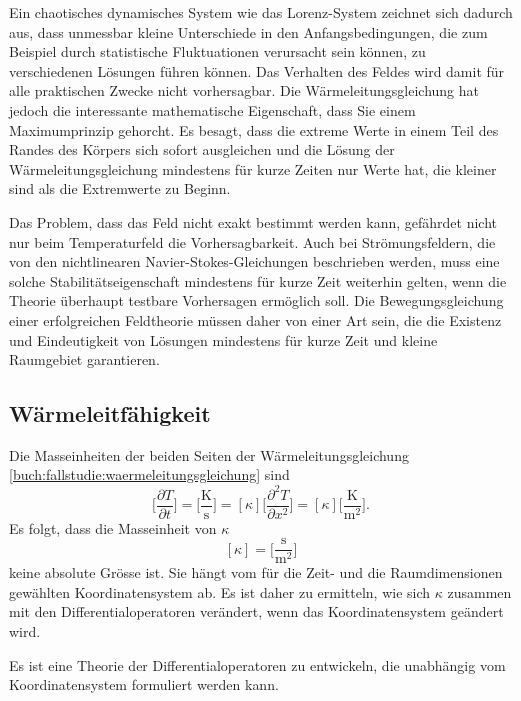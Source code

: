 Ein chaotisches dynamisches System wie das Lorenz-System zeichnet sich
dadurch aus, dass unmessbar kleine Unterschiede in den Anfangsbedingungen,
die zum Beispiel durch statistische Fluktuationen verursacht sein können,
zu verschiedenen Lösungen führen können.
Das Verhalten des Feldes wird damit für alle praktischen Zwecke nicht
vorhersagbar.
Die Wärmeleitungsgleichung hat jedoch die interessante mathematische
Eigenschaft, dass Sie einem Maximumprinzip gehorcht.
Es besagt, dass die extreme Werte in einem Teil des Randes des Körpers
sich sofort ausgleichen und die Lösung der Wärmeleitungsgleichung
mindestens für kurze Zeiten nur Werte hat, die kleiner sind als die 
Extremwerte zu Beginn.

Das Problem, dass das Feld nicht exakt bestimmt werden kann, gefährdet
nicht nur beim Temperaturfeld die Vorhersagbarkeit.
Auch bei Strömungsfeldern, die von den nichtlinearen
Navier-Stokes-Gleichungen beschrieben werden, muss eine solche
Stabilitätseigenschaft mindestens für kurze Zeit weiterhin gelten,
wenn die Theorie überhaupt testbare Vorhersagen ermöglich soll.
Die Bewegungsgleichung einer erfolgreichen Feldtheorie müssen daher
von einer Art sein, die die Existenz und Eindeutigkeit von Lösungen
mindestens für kurze Zeit und kleine Raumgebiet garantieren.

\subsection{Wärmeleitfähigkeit}
Die Masseinheiten der beiden Seiten der Wärmeleitungsgleichung 
\eqref{buch:fallstudie:waermeleitungsgleichung}
sind
\[
\biggl[
\frac{\partial T}{\partial t}
\biggr]
=
\biggl[
\frac{\text{K}}{\text{s}}
\biggr]
=
[\kappa]
\biggl[
\frac{\partial^2 T}{\partial x^2}
\biggr]
=
[\kappa]
\biggl[
\frac{\text{K}}{\text{m}^2}
\biggr].
\]
Es folgt, dass die Masseinheit von $\kappa$
\[
[\kappa]
=
\biggl[
\frac{\text{s}}{\text{m}^2}
\biggr]
\]
keine absolute Grösse ist.
Sie hängt vom für die Zeit- und die Raumdimensionen gewählten
Koordinatensystem ab.
Es ist daher zu ermitteln, wie sich $\kappa$ zusammen mit den
Differentialoperatoren verändert, wenn das Koordinatensystem
geändert wird.

\begin{aufgabe}
Es ist eine Theorie der Differentialoperatoren zu entwickeln, die
unabhängig vom Koordinatensystem formuliert werden kann.
\end{aufgabe}

